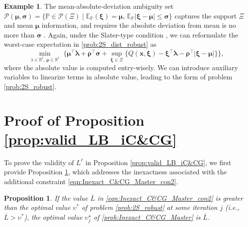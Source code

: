 \documentclass[preprint,review,11pt]{elsarticle}
\newtheorem{prop}[thm]{Proposition}
\theoremstyle{definition}
\newtheorem{example}{Example}%
\theoremstyle{remark}
\newcommand{\tp}{\top}
\newcommand{\E}{\mathbb{E}}
\newcommand{\Prob}{\mathbb{P}}
\newcommand{\R}{\mathbb{R}}
\newcommand{\calP}{\mathcal{P}}
\newcommand{\xb}{\pmb{x}}
\newcommand{\xib}{\pmb{\xi}}
\newcommand{\mub}{\pmb{\mu}}
\newcommand{\rhob}{\pmb{\rho}}
\newcommand{\lambdab}{\pmb{\lambda}}
\newcommand{\sigmab}{\pmb{\sigma}}
\newcommand{\Lbar}{\overline{L}}
\begin{document}
\begin{example} \label{eg:MAD_ambig}
The mean-absolute-deviation ambiguity set $\calP(\mub,\sigmab)=\{\Prob\in\calP(\Xi)\mid \E_\Prob(\xib)=\mub,\, \E_\Prob|\xib-\mub|\leq \sigmab\}$ captures the support $\Xi$ and mean $\mub$ information, and requires the absolute deviation from mean is no more than $\sigmab$ . Again, under the Slater-type condition , we can reformulate the worst-case expectation in \eqref{prob:2S_dist_robust} as
%
\begin{equation} \label{eg_eqn:MAD_dual}
    \min_{\lambda\in\R^l,\,\rhob\in\R^l}\,\, \bigg\{\mub^\tp\lambdab + \rhob^\tp\sigmab + \sup_{\xib\in\Xi}\bigg\{ Q(\xb,\xib)-\xib^\tp\lambdab-\rhob^\tp |\xib-\mub| \bigg\} \bigg\},
\end{equation}
%
where the absolute value is computed entry-wisely. We can introduce auxiliary variables to linearize terms in absolute value, leading to the form of problem \eqref{prob:2S_robust}. 
\end{example}



\section{Proof of Proposition \ref{prop:valid_LB_iC&CG}} \label{appdx:proof_valid_LB}

To prove the validity of $L^\ell$ in Proposition \ref{prop:valid_LB_iC&CG}, we first provide Proposition \ref{prop:opt_val_MP_iC&CG}, which addresses the inexactness associated with the additional constraint \eqref{eqn:Inexact_C&CG_Master_con2}.

\begin{prop}   \label{prop:opt_val_MP_iC&CG}
If the value $\Lbar$ in \eqref{eqn:Inexact_C&CG_Master_con2} is greater than the optimal value $\upsilon^*$ of problem \eqref{prob:2S_robust} at some iteration $j$ (i.e., $\Lbar>\upsilon^*$), the optimal value $\upsilon^\star_j$ of \eqref{prob:Inexact_C&CG_Master} is $\Lbar$.
\end{prop}
\end{document}
